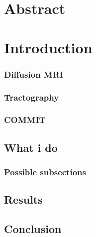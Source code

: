 \documentclass [titlepage]{article}
\begin{document}
\preparefrontpagestandard







\chapter {Abstract}
\chapter {Introduction}



\subsection {Diffusion MRI}
\subsection {Tractography}
\subsection {COMMIT}

\section {What i do}
\subsection {Possible subsections}

\section {Results}

\section {Conclusion}
\end{document}
